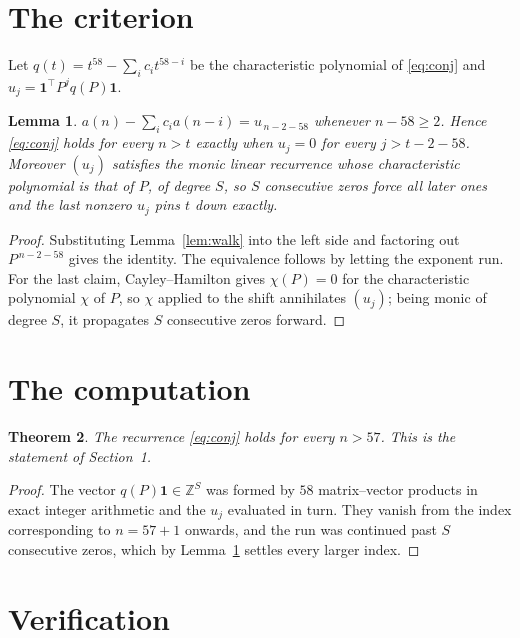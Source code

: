 \documentclass[11pt,a4paper]{article}
\theoremstyle{plain}
\newtheorem{theorem}{Theorem}
\newtheorem{lemma}[theorem]{Lemma}
\theoremstyle{definition}
\begin{document}
\section{The criterion}

Let $q(t)=t^{58}-\sum_i c_i t^{58-i}$ be the characteristic polynomial of
\eqref{eq:conj} and $u_j=\mathbf{1}^{\!\top}P^{j}q(P)\mathbf{1}$.

\begin{lemma}\label{lem:crit}
$a(n)-\sum_i c_i a(n-i)=u_{\,n-2-58}$ whenever $n-58\ge2$. Hence
\eqref{eq:conj} holds for every $n>t$ exactly when $u_j=0$ for every
$j>t-2-58$. Moreover $(u_j)$ satisfies the monic linear recurrence whose
characteristic polynomial is that of $P$, of degree $S$, so $S$ consecutive zeros force all
later ones and the last nonzero $u_j$ pins $t$ down exactly.
\end{lemma}

\begin{proof}
Substituting Lemma~\ref{lem:walk} into the left side and factoring out
$P^{\,n-2-58}$ gives the identity. The equivalence follows by letting the exponent
run. For the last claim, Cayley--Hamilton gives $\chi(P)=0$ for the characteristic
polynomial $\chi$ of $P$, so $\chi$ applied to the shift annihilates $(u_j)$; being monic of
degree $S$, it propagates $S$ consecutive zeros forward.
\end{proof}

\section{The computation}

\begin{theorem}
The recurrence \eqref{eq:conj} holds for every $n>57$. This is the statement of
Section~1.
\end{theorem}

\begin{proof}
The vector $q(P)\mathbf{1}\in\mathbb{Z}^{S}$ was formed by $58$ matrix--vector
products in exact integer arithmetic and the $u_j$ evaluated in turn. They vanish from the
index corresponding to $n=57+1$ onwards, and the run was continued past $S$ consecutive
zeros, which by Lemma~\ref{lem:crit} settles every larger index.
\end{proof}

\section{Verification}
\end{document}
